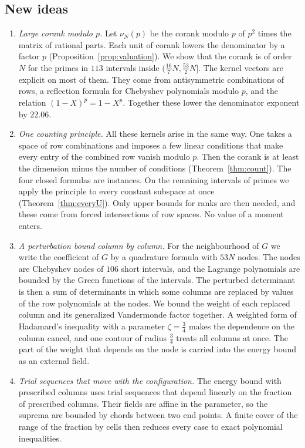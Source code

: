 \documentclass[11pt]{amsart}
\theoremstyle{definition}
\theoremstyle{remark}
\numberwithin{equation}{section}
\begin{document}
\subsection{New ideas}\label{sec:intro-ideas}
\begin{enumerate}[label=\arabic*.,wide]
\item \emph{Large corank modulo $p$.} Let $\nu_N(p)$ be the corank modulo $p$ of $p^2$ times the matrix of
rational parts. Each unit of corank lowers the denominator by a factor $p$
(Proposition~\ref{prop:valuation}). We show that the corank is of order $N$ for the primes in
$113$ intervals inside $(\frac{16}7N,\frac{53}2N]$. The kernel vectors are explicit on most of them. They come from
antisymmetric combinations of rows, a reflection formula for Chebyshev polynomials modulo $p$, and the
relation $(1-X)^p=1-X^p$. Together these lower the denominator exponent by $22.06$.

\item \emph{One counting principle.} All these kernels arise in the same way. One takes a space of row
combinations and imposes a few linear conditions that make every entry of the combined row vanish modulo
$p$. Then the corank is at least the dimension minus the number of conditions (Theorem~\ref{thm:count}).
The four closed formulas are instances. On the remaining intervals of primes we apply the principle to
every constant subspace at once (Theorem~\ref{thm:everyU}). Only upper bounds for ranks are then needed,
and these come from forced intersections of row spaces. No value of a moment enters.

\item \emph{A perturbation bound column by column.} For the neighbourhood of $G$ we write the coefficient of
$G$ by a quadrature formula with $53N$ nodes. The nodes are Chebyshev nodes of $106$ short intervals, and the
Lagrange polynomials are bounded by the Green functions of the intervals. The perturbed determinant is then
a sum of determinants in which some columns are replaced by values of the row polynomials at the nodes. We
bound the weight of each replaced column and its generalized Vandermonde factor together. A weighted form of
Hadamard's inequality with a parameter $\zeta=\frac34$ makes the dependence on the column cancel, and one
contour of radius $\frac34$ treats all columns at once. The part of the weight that depends on the node is
carried into the energy bound as an external field.

\item \emph{Trial sequences that move with the configuration.} The energy bound with prescribed columns uses
trial sequences that depend linearly on the fraction of prescribed columns. Their fields are affine in the
parameter, so the suprema are bounded by chords between two end points. A finite cover of the range of the
fraction by cells then reduces every case to exact polynomial inequalities.


\end{enumerate}
\end{document}
